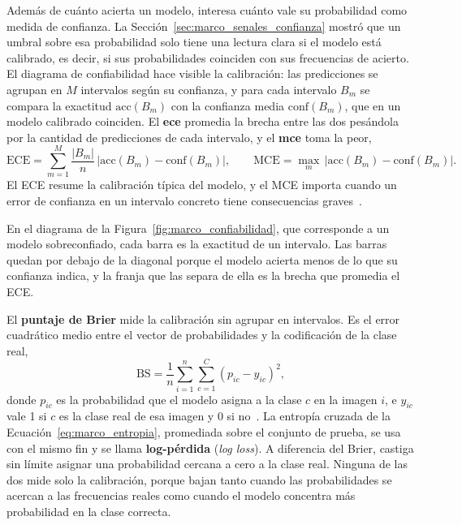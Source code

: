 Además de cuánto acierta un modelo, interesa cuánto vale su probabilidad como medida de confianza. La
Sección~\ref{sec:marco_senales_confianza} mostró que un umbral sobre esa probabilidad solo tiene una lectura clara
si el modelo está calibrado, es decir, si sus probabilidades coinciden con sus frecuencias de acierto. El diagrama
de confiabilidad hace visible la calibración: las predicciones se agrupan en $M$ intervalos según su confianza, y
para cada intervalo $B_m$ se compara la exactitud $\mathrm{acc}(B_m)$ con la confianza media
$\mathrm{conf}(B_m)$, que en un modelo calibrado coinciden. El
\textbf{\gls{ece}} promedia la brecha entre las dos pesándola por la cantidad de predicciones de cada intervalo, y
el \textbf{\gls{mce}} toma la peor,
\begin{equation}
    \mathrm{ECE} = \sum_{m=1}^{M} \frac{|B_m|}{n}\,\bigl|\mathrm{acc}(B_m) - \mathrm{conf}(B_m)\bigr|,
    \qquad
    \mathrm{MCE} = \max_{m}\,\bigl|\mathrm{acc}(B_m) - \mathrm{conf}(B_m)\bigr|.
    \label{eq:marco_ece}
\end{equation}
El ECE resume la calibración típica del modelo, y el MCE importa cuando un error de confianza en un intervalo
concreto tiene consecuencias graves~\cite{guo2017calibration}.



En el diagrama de la Figura~\ref{fig:marco_confiabilidad}, que corresponde a un modelo sobreconfiado, cada barra es
la exactitud de un intervalo. Las barras quedan por debajo de la diagonal porque el modelo acierta menos de lo que
su confianza indica, y la franja que las separa de ella es la brecha que promedia el ECE.

El \textbf{puntaje de Brier} mide la calibración sin agrupar en intervalos. Es el error cuadrático medio entre
el vector de probabilidades y la codificación de la clase real,
\begin{equation}
    \mathrm{BS} = \frac{1}{n}\sum_{i=1}^{n}\sum_{c=1}^{C} \left(p_{ic} - y_{ic}\right)^2,
    \label{eq:marco_brier}
\end{equation}
donde $p_{ic}$ es la probabilidad que el modelo asigna a la clase $c$ en la imagen $i$, e $y_{ic}$ vale 1 si
$c$ es la clase real de esa imagen y 0 si no~\cite{brier1950verification}. La entropía cruzada de la
Ecuación~\ref{eq:marco_entropia}, promediada sobre el conjunto de prueba, se usa con el mismo fin y se llama
\textbf{log-pérdida} (\emph{log loss}). A diferencia del Brier, castiga sin límite asignar una probabilidad cercana a cero a la clase
real. Ninguna de las dos mide solo la calibración, porque bajan tanto cuando las probabilidades se acercan a las
frecuencias reales como cuando el modelo concentra más probabilidad en la clase correcta.

